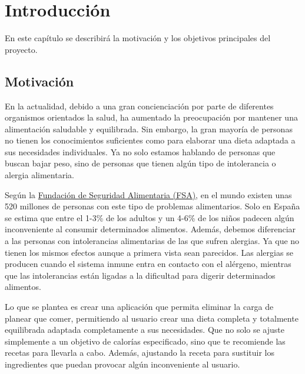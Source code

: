 \chapter{Introducción}
En este capítulo se describirá la motivación y los objetivos principales del proyecto.

\section{Motivación}
En la actualidad, debido a una gran concienciación por parte de diferentes organismos orientados la salud, ha aumentado la preocupación por mantener una alimentación saludable y equilibrada. Sin embargo, la gran mayoría de personas no tienen los conocimientos suficientes como para elaborar una dieta adaptada a sus necesidades individuales. Ya no solo estamos hablando de personas que buscan bajar peso, sino de personas que tienen algún tipo de intolerancia o alergia alimentaria. 

Según la \href{https://funsapa.org/alergia-alimentaria/incidencia/}{Fundación de Seguridad Alimentaria (FSA)}, en el mundo existen unas 520 millones de personas con este tipo de problemas alimentarios. Solo en España se estima que entre el 1-3\% de los adultos y un 4-6\% de los niños padecen algún inconveniente al consumir determinados alimentos. Además, debemos diferenciar a las personas con intolerancias alimentarias de las que sufren alergias. Ya que no tienen los mismos efectos aunque a primera vista sean parecidos. Las alergias se producen cuando el sistema inmune entra en contacto con el alérgeno, mientras que las intolerancias están ligadas a la dificultad para digerir determinados alimentos.

Lo que se plantea es crear una aplicación que permita eliminar la carga de planear que comer, permitiendo al usuario crear una dieta completa y totalmente equilibrada adaptada completamente a sus necesidades. Que no solo se ajuste simplemente a un objetivo de calorías especificado, sino que te recomiende las recetas para llevarla a cabo. Además, ajustando la receta para sustituir los ingredientes que puedan provocar algún inconveniente al usuario.

